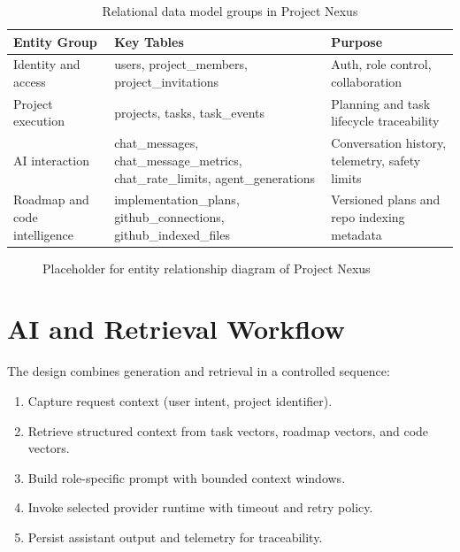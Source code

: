 \documentclass[a4paper, 11pt, oneside]{Dissertation}
\begin{document}
\begin{table}[H]
\centering
\begin{tabular}{|L{3.0cm}|L{6.0cm}|L{2.5cm}|}
\hline
\textbf{Entity Group} & \textbf{Key Tables} & \textbf{Purpose} \\
\hline
Identity and access & users, project\_members, project\_invitations & Auth, role control, collaboration \\
\hline
Project execution & projects, tasks, task\_events & Planning and task lifecycle traceability \\
\hline
AI interaction & chat\_messages, chat\_message\_metrics, chat\_rate\_limits, agent\_generations & Conversation history, telemetry, safety limits \\
\hline
Roadmap and code intelligence & implementation\_plans, github\_connections, github\_indexed\_files & Versioned plans and repo indexing metadata \\
\hline
\end{tabular}
\caption{Relational data model groups in Project Nexus}
\label{tab:data-model-groups}
\end{table}

\begin{figure}[H]
\centering
{}
\caption{Placeholder for entity relationship diagram of Project Nexus}
\label{fig:er-diagram}
\end{figure}

\FloatBarrier

\section{AI and Retrieval Workflow}
The design combines generation and retrieval in a controlled sequence:

\begin{enumerate}
\item Capture request context (user intent, project identifier).
\item Retrieve structured context from task vectors, roadmap vectors, and code vectors.
\item Build role-specific prompt with bounded context windows.
\item Invoke selected provider runtime with timeout and retry policy.
\item Persist assistant output and telemetry for traceability.
\end{enumerate}
\end{document}
